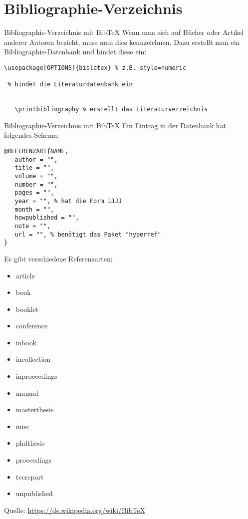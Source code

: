 \section{Bibliographie-Verzeichnis}
\begin{frame}[fragile]{Bibliographie-Verzeichnis mit Bib\TeX}
Wenn man sich auf Bücher oder Artikel anderer Autoren bezieht, muss man dies kennzeichnen. Dazu erstellt man ein Bibliographie-Datenbank und bindet diese ein:
\begin{lstlisting}[style=tex]
\usepackage[OPTIONS]{biblatex} % z.B. style=numeric

 % bindet die Literaturdatenbank ein


   \printbibliography % erstellt das Literaturverzeichnis

\end{lstlisting}
\end{frame}

\begin{frame}[fragile]{Bibliographie-Verzeichnis mit Bib\TeX}
Ein Eintrag in der Datenbank hat folgendes Schema:
\begin{lstlisting}[style=tex]
@REFERENZART{NAME,
   author = "",
   title = "",
   volume = "",
   number = "",
   pages = "",
   year = "", % hat die Form JJJJ
   month = "",
   howpublished = "",
   note = "",
   url = "", % benötigt das Paket "hyperref"
}
\end{lstlisting}

Es gibt verschiedene Referenzarten:
\begin{small}
\vspace{-1ex}
\begin{multicols}{3}
\begin{itemize}\setlength{\itemsep}{-0.5ex}
\item article
\item book
\item booklet
\item conference
\item inbook
\item incollection
\item inproceedings
\item manual
\item masterthesis
\item misc
\item phdthesis
\item proceedings
\item tecreport
\item unpublished
\end{itemize}
\end{multicols}
\end{small}

Quelle: \url{https://de.wikipedia.org/wiki/BibTeX}
\end{frame}

